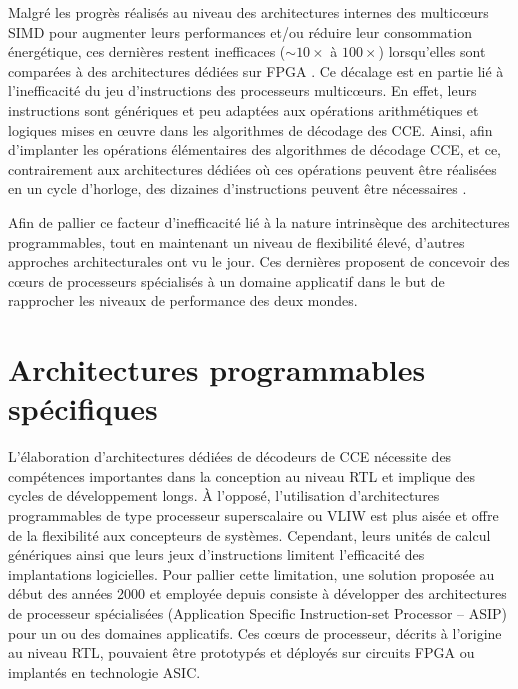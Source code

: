 \documentclass[../main.tex]{subfiles}
\begin{document}
Malgré les progrès réalisés au niveau des architectures internes des multicœurs SIMD pour augmenter leurs performances et/ou réduire leur consommation énergétique, ces dernières restent inefficaces ($\sim 10 \times$ à $100 \times$) lorsqu’elles sont comparées à des architectures dédiées sur FPGA \cite{FAIR:LDPC}. Ce décalage est en partie lié à l’inefficacité du jeu d’instructions des processeurs multicœurs. En effet, leurs instructions sont génériques et peu adaptées aux opérations arithmétiques et logiques mises en œuvre dans les algorithmes de décodage des CCE. Ainsi, afin d’implanter les opérations élémentaires des algorithmes de décodage CCE, et ce, contrairement aux architectures dédiées où ces opérations peuvent être réalisées en un cycle d’horloge, des dizaines d’instructions peuvent être nécessaires \cite{LDPC:SOFT4}.


Afin de pallier ce facteur d’inefficacité lié à la nature intrinsèque des architectures programmables, tout en maintenant un niveau de flexibilité élevé, d’autres approches architecturales ont vu le jour. Ces dernières proposent de concevoir des cœurs de processeurs spécialisés à un domaine applicatif dans le but de rapprocher les niveaux de performance des deux mondes.
% 
% 
% 
% 
% 
\section{Architectures programmables spécifiques}
% 
% 
% 
% 
% 
L'élaboration d’architectures dédiées de décodeurs de CCE nécessite des compétences importantes dans la conception au niveau RTL et implique des cycles de développement longs. À l’opposé, l’utilisation d’architectures programmables de type processeur superscalaire ou VLIW est plus aisée et offre de la flexibilité aux concepteurs de systèmes. Cependant, leurs unités de calcul génériques ainsi que leurs jeux d’instructions limitent l’efficacité des implantations logicielles. Pour pallier cette limitation, une solution proposée au début des années 2000 \cite{XXX} et employée depuis consiste à développer des architectures de processeur spécialisées (Application Specific Instruction-set Processor – ASIP) pour un ou des domaines applicatifs. Ces cœurs de processeur, décrits à l’origine au niveau RTL, pouvaient être prototypés et déployés sur circuits FPGA ou implantés en technologie ASIC.
\end{document}
